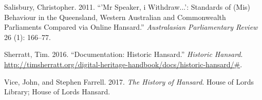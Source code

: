 \documentclass[
  letterpaper,
  DIV=11,
  numbers=noendperiod]{scrartcl}
\newlength{\cslhangindent}
\newlength{\cslentryspacingunit} %
\newenvironment{CSLReferences}[2] %
 {%
  \setlength{\parindent}{0pt}
  \ifodd #1
  \let\oldpar\par
  \def\par{\hangindent=\cslhangindent\oldpar}
  \fi
  \setlength{\parskip}{#2\cslentryspacingunit}
 }%
 {}
\begin{document}
\begin{CSLReferences}{1}{0}
\leavevmode{}%
Salisbury, Christopher. 2011. {``'Mr Speaker, i Withdraw...': Standards
of (Mis) Behaviour in the Queensland, Western Australian and
Commonwealth Parliaments Compared via Online Hansard.''}
\emph{Australasian Parliamentary Review} 26 (1): 166--77.

\leavevmode{}%
Sherratt, Tim. 2016. {``Documentation: Historic Hansard.''}
\emph{Historic Hansard}.
\url{http://timsherratt.org/digital-heritage-handbook/docs/historic-hansard/\#}.

\leavevmode{}%
Vice, John, and Stephen Farrell. 2017. \emph{The History of Hansard}.
House of Lords Library; House of Lords Hansard.

\end{CSLReferences}
\end{document}
